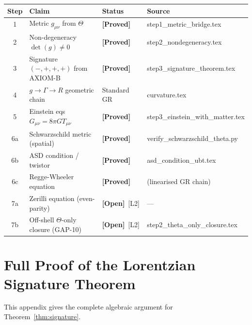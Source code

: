 \documentclass[12pt,a4paper]{article}
\theoremstyle{definition}
\theoremstyle{remark}
\newcommand{\PROVED}{\textbf{[Proved]}}
\newcommand{\OPEN}{\textbf{[Open]}}
\newcommand{\Gmn}{G_{\mu\nu}}
\newcommand{\gmn}{g_{\mu\nu}}
\newcommand{\Tmn}{T_{\mu\nu}}
\begin{document}
\begin{tcolorbox}[colback=blue!3!white,colframe=blue!55!black,
  title=T1\_GR Proof Status Summary]
\begin{center}
\begin{tabular}{clll}
\toprule
\textbf{Step} & \textbf{Claim} & \textbf{Status} & \textbf{Source} \\
\midrule
1  & Metric $\gmn$ from $\Theta$               & \PROVED & step1\_metric\_bridge.tex \\
2  & Non-degeneracy $\det(g)\neq 0$            & \PROVED & step2\_nondegeneracy.tex \\
3  & Signature $(-,+,+,+)$ from AXIOM-B       & \PROVED & step3\_signature\_theorem.tex \\
4  & $g\to\Gamma\to R$ geometric chain         & Standard GR & curvature.tex \\
5  & Einstein eqs $\Gmn=8\pi G\Tmn$           & \PROVED & step3\_einstein\_with\_matter.tex \\
6a & Schwarzschild metric (spatial)            & \PROVED & verify\_schwarzschild\_theta.py \\
6b & ASD condition / twistor                  & \PROVED & asd\_condition\_ubt.tex \\
6c & Regge-Wheeler equation                   & \PROVED & (linearised GR chain) \\
7a & Zerilli equation (even-parity)            & \OPEN~[L2] & — \\
7b & Off-shell $\Theta$-only closure (GAP-10) & \OPEN~[L2] & step2\_theta\_only\_closure.tex \\
\bottomrule
\end{tabular}
\end{center}
\end{tcolorbox}


\appendix

\section{Full Proof of the Lorentzian Signature Theorem}
\label{app:signature}

This appendix gives the complete algebraic argument for
Theorem~\ref{thm:signature}.
\end{document}
